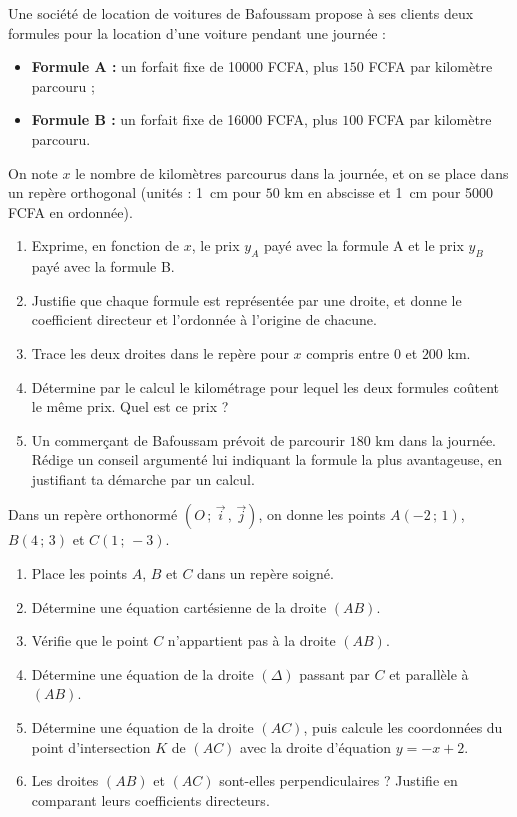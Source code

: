 \documentclass[11pt]{article}
\begin{document}
\begin{exercice}
Une société de location de voitures de Bafoussam propose à ses clients deux formules pour la location d'une voiture pendant une journée :
\begin{itemize}
\item \textbf{Formule A :} un forfait fixe de \num{10000} FCFA, plus $150$ FCFA par kilomètre parcouru ;
\item \textbf{Formule B :} un forfait fixe de \num{16000} FCFA, plus $100$ FCFA par kilomètre parcouru.
\end{itemize}
On note $x$ le nombre de kilomètres parcourus dans la journée, et on se place dans un repère orthogonal (unités : \SI{1}{cm} pour $50$ km en abscisse et \SI{1}{cm} pour \num{5000} FCFA en ordonnée).
\begin{enumerate}
\item Exprime, en fonction de $x$, le prix $y_A$ payé avec la formule A et le prix $y_B$ payé avec la formule B.
\item Justifie que chaque formule est représentée par une droite, et donne le coefficient directeur et l'ordonnée à l'origine de chacune.
\item Trace les deux droites dans le repère pour $x$ compris entre $0$ et $200$ km.
\item Détermine par le calcul le kilométrage pour lequel les deux formules coûtent le même prix. Quel est ce prix ?
\item Un commerçant de Bafoussam prévoit de parcourir $180$ km dans la journée. Rédige un conseil argumenté lui indiquant la formule la plus avantageuse, en justifiant ta démarche par un calcul.
\end{enumerate}
\end{exercice}

\begin{exercice}
Dans un repère orthonormé $(O\,;\,\vec{i}\,,\,\vec{j})$, on donne les points $A(-2\,;\,1)$, $B(4\,;\,3)$ et $C(1\,;\,-3)$.
\begin{enumerate}
\item Place les points $A$, $B$ et $C$ dans un repère soigné.
\item Détermine une équation cartésienne de la droite $(AB)$.
\item Vérifie que le point $C$ n'appartient pas à la droite $(AB)$.
\item Détermine une équation de la droite $(\Delta)$ passant par $C$ et parallèle à $(AB)$.
\item Détermine une équation de la droite $(AC)$, puis calcule les coordonnées du point d'intersection $K$ de $(AC)$ avec la droite d'équation $y = -x + 2$.
\item Les droites $(AB)$ et $(AC)$ sont-elles perpendiculaires ? Justifie en comparant leurs coefficients directeurs.
\end{enumerate}
\end{exercice}
\end{document}
